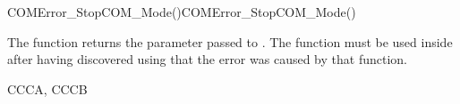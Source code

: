 \begin{function_nopb2}{COMError\_StopCOM\_Mode()}{COMError_StopCOM_Mode()}
  \begin{fundescription}
    The function returns the  parameter passed to
    . The function must be used inside
     after having discovered using
     that the error was caused by that
    function.
  \end{fundescription}
  \begin{funreturn}
  \end{funreturn}
  \begin{funconformance}
   CCCA, CCCB
  \end{funconformance}
\end{function_nopb2}




